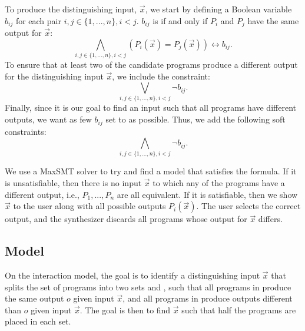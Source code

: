 To produce the distinguishing input, \(\vec{x}\), we start by defining a Boolean variable \(b_{ij}\) for each pair \(i,j\in\{1, ..., n\},i<j\). \(b_{ij}\) is \true if and only if \(P_i\) and \(P_j\) have the same output for \(\vec{x}\):
%
\begin{equation}
    \bigwedge_{i,j \in \{1, ..., n\}, i < j} (P_i(\vec{x}) = P_j(\vec{x})) \leftrightarrow b_{ij}.
\end{equation}
%
To ensure that at least two of the candidate programs produce a different output for the distinguishing input \(\vec{x}\), we include the constraint:
%
\begin{equation}
    \bigvee_{i,j \in \{1, ..., n\}, i < j} \neg b_{ij}.
\end{equation}
%
Finally, since it is our goal to find an input such that all programs have different outputs, we want as few \(b_{ij}\) set to \true as possible.
Thus, we add the following soft constraints:
%
\begin{equation}
    \bigwedge_{i,j \in \{1, ..., n\}, i < j} \neg b_{ij}.
\end{equation}

We use a \ac{MaxSMT} solver to try and find a model that satisfies the formula. If it is unsatisfiable, then there is no input \(\vec{x}\) to which any of the programs have a different output, i.e., \(P_1, ..., P_n\) are all equivalent. If it is satisfiable, then we show \(\vec{x}\) to the user along with all possible outputs \(P_i(\vec{x})\). The user selects the correct output, and the synthesizer discards all programs whose output for \(\vec{x}\) differs.

\subsection{\ynmodel Model}\label{sec:rel-yn-interaction}

On the \ynmodel interaction model, the goal is to identify a distinguishing input \(\vec{x}\) that splits the set of programs into two sets  and , such that all programs in  produce the same output \(o\)  given input \(\vec{x}\), and all programs in  produce outputs different than \(o\) given input \(\vec{x}\).
%
The goal is then to find \(\vec{x}\) such that half the programs are placed in each set.

